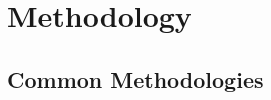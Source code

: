 \documentclass[11pt,a4paper]{article}
\begin{document}

\section{Methodology}

\subsection{Common Methodologies}
\end{document}

